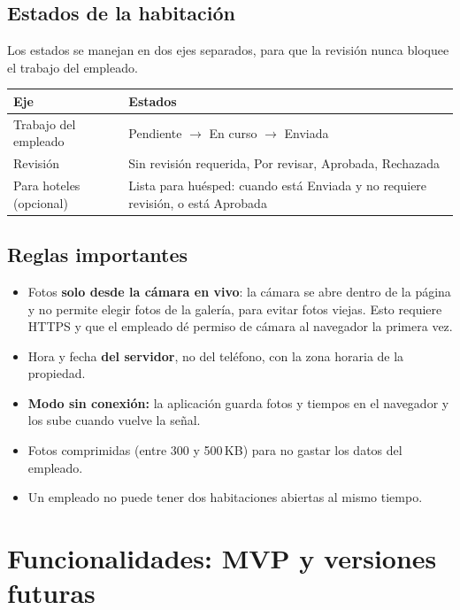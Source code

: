 \documentclass[11pt,a4paper]{article}
\begin{document}
\subsection{Estados de la habitación}

Los estados se manejan en dos ejes separados, para que la revisión nunca bloquee el trabajo del empleado.

\begin{center}
\small
\begin{tabularx}{\linewidth}{L{4.2cm} Y}
\toprule
\textbf{Eje} & \textbf{Estados}\\
\midrule
Trabajo del empleado & Pendiente $\rightarrow$ En curso $\rightarrow$ Enviada\\
Revisión & Sin revisión requerida, Por revisar, Aprobada, Rechazada\\
Para hoteles (opcional) & Lista para huésped: cuando está Enviada y no requiere revisión, o está Aprobada\\
\bottomrule
\end{tabularx}
\end{center}

\subsection{Reglas importantes}

\begin{itemize}[leftmargin=1.2em]
  \item Fotos \textbf{solo desde la cámara en vivo}: la cámara se abre dentro de la página y no permite elegir fotos de la galería, para evitar fotos viejas. Esto requiere HTTPS y que el empleado dé permiso de cámara al navegador la primera vez.
  \item Hora y fecha \textbf{del servidor}, no del teléfono, con la zona horaria de la propiedad.
  \item \textbf{Modo sin conexión:} la aplicación guarda fotos y tiempos en el navegador y los sube cuando vuelve la señal.
  \item Fotos comprimidas (entre 300 y 500\,KB) para no gastar los datos del empleado.
  \item Un empleado no puede tener dos habitaciones abiertas al mismo tiempo.
\end{itemize}

\section{Funcionalidades: MVP y versiones futuras}
\end{document}
